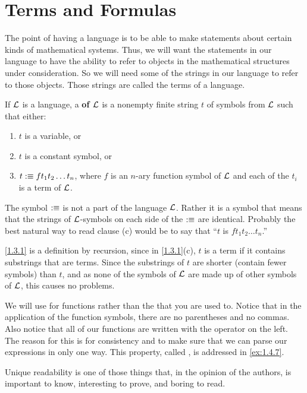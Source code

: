\section{Terms and Formulas}\label{sec:1.3}

\begin{note}
  The point of having a language is to be able to make statements about certain kinds of mathematical systems.
  Thus, we will want the statements in our language to have the ability to refer to objects in the mathematical structures under consideration.
  So we will need some of the strings in our language to refer to those objects.
  Those strings are called the terms of a language.
\end{note}

\begin{defn}\label{1.3.1}
  If \(\mathcal{L}\) is a language, a \textbf{ of \(\mathcal{L}\)} is a nonempty finite string \(t\) of symbols from \(\mathcal{L}\) such that either:
  \begin{enumerate}
    \item \(t\) is a variable, or
    \item \(t\) is a constant symbol, or
    \item \(t :\equiv f t_1 t_2 \dots t_n\), where \(f\) is an \(n\)-ary function symbol of \(\mathcal{L}\) and each of the \(t_i\) is a term of \(\mathcal{L}\).
  \end{enumerate}
  The symbol \(:\equiv\) is not a part of the language \(\mathcal{L}\).
  Rather it is a  symbol that means that the strings of \(\mathcal{L}\)-symbols on each side of the \(:\equiv\) are identical.
  Probably the best natural way to read clause (c) would be to say that ``\(t\) is \(f t_1 t_2 \dots t_n\).''
\end{defn}

\begin{note}
  \cref{1.3.1} is a definition by recursion, since in \cref{1.3.1}(c), \(t\) is a term if it contains substrings that are terms.
  Since the substrings of \(t\) are shorter (contain fewer symbols) than \(t\), and as none of the symbols of \(\mathcal{L}\) are made up of other symbols of \(\mathcal{L}\), this causes no problems.
\end{note}

\begin{note}
  We will use \textbf{} for functions rather than the \textbf{} that you are used to.
  Notice that in the application of the function symbols, there are no parentheses and no commas.
  Also notice that all of our functions are written with the operator on the left.
  The reason for this is for consistency and to make sure that we can parse our expressions in only one way.
  This property, called \textbf{}, is addressed in \cref{ex:1.4.7}.

  Unique readability is one of those things that, in the opinion of the authors, is important to know, interesting to prove, and boring to read.
\end{note}

